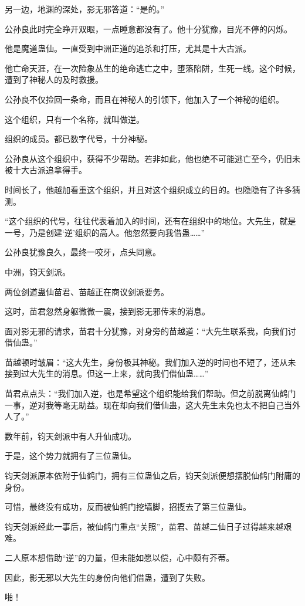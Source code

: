 \begin{this_body}
另一边，地渊的深处，影无邪答道：“是的。”

公孙良此时完全睁开双眼，一点睡意都没有了。他十分犹豫，目光不停的闪烁。

他是魔道蛊仙。一直受到中洲正道的追杀和打压，尤其是十大古派。

他亡命天涯，在一次险象丛生的绝命逃亡之中，堕落陷阱，生死一线。这个时候，遭到了神秘人的及时救援。

公孙良不仅捡回一条命，而且在神秘人的引领下，他加入了一个神秘的组织。

这个组织，只有一个名称，就叫做逆。

组织的成员。都已数字代号，十分神秘。

公孙良从这个组织中，获得不少帮助。若非如此，他也绝不可能逃亡至今，仍旧未被十大古派追拿得手。

时间长了，他越加看重这个组织，并且对这个组织成立的目的。也隐隐有了许多猜测。

“这个组织的代号，往往代表着加入的时间，还有在组织中的地位。大先生，就是一号，乃是创建‘逆’组织的高人。他忽然要向我借蛊……”

公孙良犹豫良久，最终一咬牙，点头同意。

中洲，钧天剑派。

两位剑道蛊仙苗君、苗越正在商议剑派要务。

这时，苗君忽然身躯微微一震，接到影无邪传来的消息。

面对影无邪的请求，苗君十分犹豫，对身旁的苗越道：“大先生联系我，向我们讨借仙蛊。”

苗越顿时皱眉：“这大先生，身份极其神秘。我们加入逆的时间也不短了，还从未接到过大先生的消息。但这一上来，就向我们借仙蛊……”

苗君点点头：“我们加入逆，也是希望这个组织能给我们帮助。但之前脱离仙鹤门一事，逆对我等毫无助益。现在却向我们借仙蛊，这大先生未免也太不把自己当外人了。”

数年前，钧天剑派中有人升仙成功。

于是，这个势力就拥有了三位蛊仙。

钧天剑派原本依附于仙鹤门，拥有三位蛊仙之后，钧天剑派便想摆脱仙鹤门附庸的身份。

可惜，最终没有成功，反而被仙鹤门挖墙脚，招揽去了第三位蛊仙。

钧天剑派经此一事后，被仙鹤门重点“关照”，苗君、苗越二仙日子过得越来越艰难。

二人原本想借助“逆”的力量，但未能如愿以偿，心中颇有芥蒂。

因此，影无邪以大先生的身份向他们借蛊，遭到了失败。

啪！


\end{this_body}
